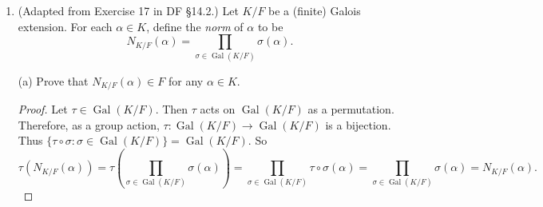 \documentclass[10pt]{article}
\newcommand{\Q}{\mathbb{Q}}
\DeclareMathOperator*{\Gal}{Gal}
\begin{document}
\begin{enumerate}
\begin{proof}
Note that
$$
\dfrac{\sqrt{2 - \sqrt{2}}}{\sqrt{2 + \sqrt{2}}} = \dfrac{\sqrt{2 - \sqrt{2}}}{\sqrt{2 + \sqrt{2}}} \cdot \dfrac{\sqrt{2 + \sqrt{2}}}{\sqrt{2 + \sqrt{2}}} = \dfrac{\sqrt{4-2}}{2 + \sqrt{2}} = \dfrac{\sqrt{2}}{2 + \sqrt{2}} \cdot \dfrac{2 - \sqrt{2}}{2 - \sqrt{2}}
$$
$$
= \dfrac{2\sqrt{2} - 2}{4-2} = \dfrac{2\sqrt{2} - 2}{2} = \sqrt{2} - 1.
$$
Also, $\left( \sqrt{2 + \sqrt{2}} \right)^2 - 3 = 2 + \sqrt{2} - 3 = \sqrt{2} - 1 \in \Q(\sqrt{2 + \sqrt{2}})$.  Therefore, $\sqrt{2 - \sqrt{2}} = (\sqrt{2} - 1)\sqrt{2 + \sqrt{2}} = \in \Q(\sqrt{2 + \sqrt{2}})$.  So $\Q(\sqrt{2 + \sqrt{2}})$ is Galois.

Since the Galois group has order 4, and there are 4 possible images for any given root, it must be that the action of an automorphism $\sigma$ on one root determines the entire map.  So consider the action of $\sigma$ on the root $\sqrt{2 + \sqrt{2}}$.

First, note that $$\left(\sqrt{2 + \sqrt{2}}\right)\left(\sqrt{2 - \sqrt{2}}\right) = \sqrt{2}.$$

Now, define $\sigma$ by $\sqrt{2 + \sqrt{2}} \mapsto \sqrt{2 - \sqrt{2}}$.  Then $\left(\sqrt{2 + \sqrt{2}}\right)^2 = 2 + \sqrt{2} \mapsto 2 + \sigma(\sqrt{2}) = \left(\sqrt{2 - \sqrt{2}}\right)^2 = 2 - \sqrt{2}$, so $\sqrt{2} \mapsto -\sqrt{2}$.  Thus,
$$
\sigma\left(\sqrt{2 - \sqrt{2}}\right) =  \dfrac{\sigma\left(\sqrt{2 + \sqrt{2}}\right)}{\sigma(\sqrt{2})} = \dfrac{\sqrt{2 - \sqrt{2}}}{-\sqrt{2}} = - \sqrt{2 + \sqrt{2}}.
$$

So $\sigma$ rotates the roots of $p(x)$.  Therefore, it cannot be that $\sigma^2$ is the identity, since $\sigma^2(\sqrt{2 + \sqrt{2}}) = \sigma(\sqrt{2 - \sqrt{2}} = -\sqrt{2 + \sqrt{2}}$.  Since $\sigma$ is nontrivial and does not have order 2, it must have order 4.  So $\Gal\left(\Q\left(\sqrt{2 + \sqrt{2}}\right)\right)$ contains an element of order 4, thus it is a cyclic group of order 4.
\end{proof}

\item (Adapted from Exercise 17 in DF \S 14.2.) Let $K/F$ be a (finite) Galois extension.  For each $\alpha \in K$, define the \emph{norm} of $\alpha$ to be 
\[
N_{K/F}(\alpha) = \prod_{\sigma \in \Gal (K/F)} \sigma(\alpha) \text{.}
\]

(a) Prove that $N_{K/F}(\alpha) \in F$ for any $\alpha \in K$.

\begin{proof}

Let $\tau \in \Gal(K/F)$.  Then $\tau$ acts on $\Gal(K/F)$ as a permutation.  Therefore, as a group action, $\tau : \Gal(K/F) \rightarrow \Gal(K/F)$ is a bijection.  Thus $\{\tau \circ \sigma : \sigma \in \Gal(K/F)\} = \Gal(K/F)$.  So
$$
\tau \left( N_{K/F}(\alpha) \right) = \tau \left(\prod_{\sigma \in \Gal (K/F)} \sigma(\alpha) \right) = \prod_{\sigma \in \Gal (K/F)} \tau \circ \sigma(\alpha)
= \prod_{\sigma \in \Gal (K/F)} \sigma(\alpha) = N_{K/F}(\alpha).
$$


\end{proof}
\end{enumerate}
\end{document}
